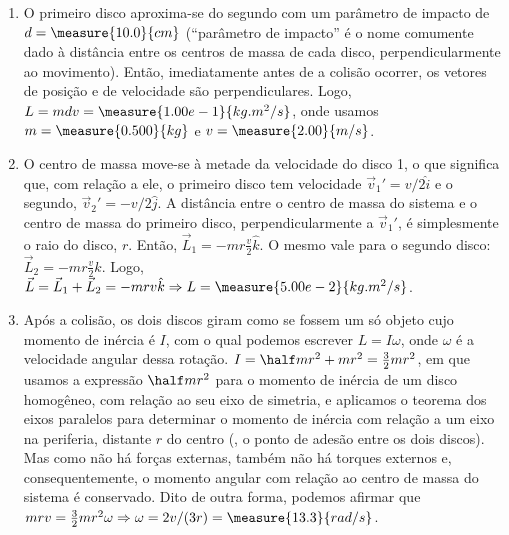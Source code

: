 \begin{question}
    \begin{solution}
      \begin{enumerate}
        \item O primeiro disco aproxima-se do segundo com um parâmetro de impacto de $d = \measure{10.0}{cm}$ (``parâmetro de impacto'' é o nome comumente dado à distância entre os centros de massa de cada disco, perpendicularmente ao movimento).
        Então, imediatamente antes de a colisão ocorrer, os vetores de posição e de velocidade são perpendiculares.
        Logo, $L = mdv = \measure{1.00e-1}{kg.m^2/s}$, onde usamos $m = \measure{0.500}{kg}$ e $v = \measure{2.00}{m/s}$.
        \item O centro de massa move-se à metade da velocidade do disco 1, o que significa que, com relação a ele, o primeiro disco tem velocidade $\vec v_1' = v/2\hat i$ e o segundo, $\vec v_2' = -v/2\hat j$.
        A distância entre o centro de massa do sistema e o centro de massa do primeiro disco, perpendicularmente a $\vec v_1'$, é simplesmente o raio do disco, $r$.
        Então, $\vec L_1 = -mr\frac{v}{2}\hat k$.
        O mesmo vale para o segundo disco: $\vec L_2 = -mr\frac{v}{2}\hat k$.
        Logo, $\vec L = \vec L_1 + \vec L_2 = -mrv\hat k \Rightarrow L = \measure{5.00e-2}{kg.m^2/s}$.
        \item Após a colisão, os dois discos giram como se fossem um só objeto cujo momento de inércia é $I$, com o qual podemos escrever $L = I\omega$, onde $\omega$ é a velocidade angular dessa rotação.
        $I = \half mr^2 + mr^2 = \frac{3}{2}mr^2$, em que usamos a expressão $\half m r^2$ para o momento de inércia de um disco homogêneo, com relação ao seu eixo de simetria, e aplicamos o teorema dos eixos paralelos para determinar o momento de inércia com relação a um eixo na periferia, distante $r$ do centro (\ie, o ponto de adesão entre os dois discos).
        Mas como não há forças externas, também não há torques externos e, consequentemente, o momento angular com relação ao centro de massa do sistema é conservado.
        Dito de outra forma, podemos afirmar que $mrv = \frac{3}{2}mr^2\omega \Rightarrow \omega = 2v/(3r) = \measure{13.3}{rad/s}$.
      \end{enumerate}
    \end{solution}
\end{question}